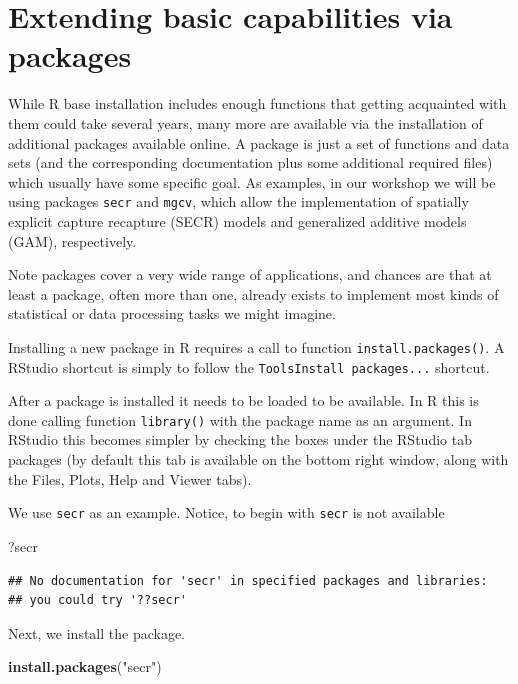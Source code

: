 \documentclass[]{book}
\newenvironment{Shaded}{\begin{snugshade}}{\end{snugshade}}
\newcommand{\KeywordTok}[1]{\textcolor[rgb]{0.13,0.29,0.53}{\textbf{#1}}}
\newcommand{\StringTok}[1]{\textcolor[rgb]{0.31,0.60,0.02}{#1}}
\newcommand{\NormalTok}[1]{#1}
\theoremstyle{definition}
\theoremstyle{definition}
\theoremstyle{remark}
\begin{document}
\section{Extending basic capabilities via
packages}\label{extending-basic-capabilities-via-packages}

While R base installation includes enough functions that getting
acquainted with them could take several years, many more are available
via the installation of additional packages available online. A package
is just a set of functions and data sets (and the corresponding
documentation plus some additional required files) which usually have
some specific goal. As examples, in our workshop we will be using
packages \texttt{secr} and \texttt{mgcv}, which allow the implementation
of spatially explicit capture recapture (SECR) models and generalized
additive models (GAM), respectively.

Note packages cover a very wide range of applications, and chances are
that at least a package, often more than one, already exists to
implement most kinds of statistical or data processing tasks we might
imagine.

Installing a new package in R requires a call to function
\texttt{install.packages()}. A RStudio shortcut is simply to follow the
\texttt{Tools\textbar{}Install\ packages...} shortcut.

After a package is installed it needs to be loaded to be available. In R
this is done calling function \texttt{library()} with the package name
as an argument. In RStudio this becomes simpler by checking the boxes
under the RStudio tab packages (by default this tab is available on the
bottom right window, along with the Files, Plots, Help and Viewer tabs).

We use \texttt{secr} as an example. Notice, to begin with \texttt{secr}
is not available

\begin{Shaded}
\begin{Highlighting}[]
\NormalTok{?secr}
\end{Highlighting}
\end{Shaded}

\begin{verbatim}
## No documentation for 'secr' in specified packages and libraries:
## you could try '??secr'
\end{verbatim}

Next, we install the package.

\begin{Shaded}
\begin{Highlighting}[]
\KeywordTok{install.packages}\NormalTok{(}\StringTok{"secr"}\NormalTok{)}
\end{Highlighting}
\end{Shaded}
\end{document}
